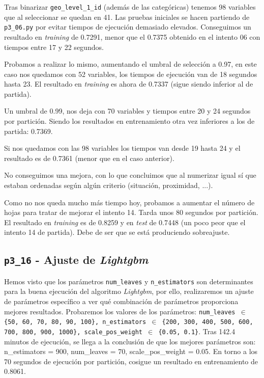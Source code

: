 \documentclass[a4paper, 20pt]{article}
\begin{document}
Tras binarizar \texttt{geo\_level\_1\_id} (además de las categóricas) tenemos 98 variables que al seleccionar se quedan en 41. Las pruebas iniciales se hacen partiendo de \texttt{p3\_06.py} por evitar tiempos de ejecución demasiado elevados. Conseguimos un resultado en \textit{training} de 0.7291, menor que el 0.7375 obtenido en el intento 06 con tiempos entre 17 y 22 segundos.

Probamos a realizar lo mismo, aumentando el umbral de selección a 0.97, en este caso nos quedamos con 52 variables, los tiempos de ejecución van de 18 segundos hasta 23. El resultado en \textit{training} es ahora de 0.7337 (sigue siendo inferior al de partida).

Un umbral de 0.99, nos deja con 70 variables y tiempos entre 20 y 24 segundos por partición. Siendo los resultados en entrenamiento otra vez inferiores a los de partida: 0.7369.

Si nos quedamos con las 98 variables los tiempos van desde 19 hasta 24 y el resultado es de 0.7361 (menor que en el caso anterior).

No conseguimos una mejora, con lo que concluimos que al numerizar igual sí que estaban ordenadas según algún criterio (situación, proximidad, ...).

Como no nos queda mucho más tiempo hoy, probamos a aumentar el número de hojas para tratar de mejorar el intento 14. Tarda unos 80 segundos por partición. El resultado en \textit{training} es de 0.8259 y en \textit{test} de 0.7448 (un poco peor que el intento 14 de partida). Debe de ser que se está produciendo sobreajuste.

\subsection{\texttt{p3\_16} - Ajuste de \textit{Lightgbm}}

Hemos visto que los parámetros \texttt{num\_leaves} y \texttt{n\_estimators} son determinantes para la buena ejecución del algoritmo \textit{Lightgbm}, por ello, realizaremos un ajuste de parámetros específico a ver qué combinación de parámetros proporciona mejores resultados. Probaremos los valores de los parámetros: \texttt{num\_leaves $\in$ \{50, 60, 70, 80, 90, 100\}, n\_estimators $\in$ \{200, 300, 400, 500, 600, 700, 800, 900, 1000\},
  scale\_pos\_weight $\in$ \{0.05, 0.1\}}. Tras  142.4 minutos de ejecución, se llega a la conclusión de que los mejores parámetros son: {\ttfamily n\_estimators = 900, num\_leaves = 70, scale\_pos\_weight = 0.05}. En torno a los 70 segundos de ejecución por partición, cosigue un resultado en entrenamiento de 0.8061.
\end{document}
